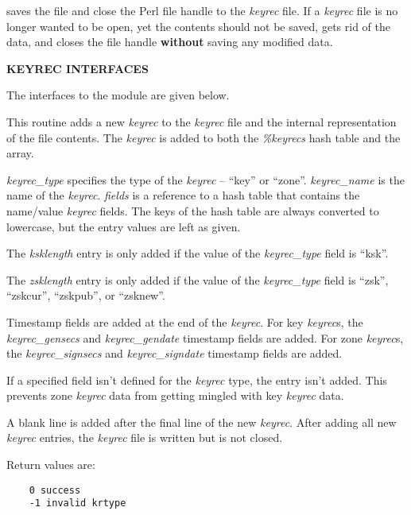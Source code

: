  saves the file and close the Perl file handle to the
{\it keyrec} file.  If a {\it keyrec} file is no longer wanted to be open, yet
the contents should not be saved,  gets rid of the
data, and closes the file handle {\bf without} saving any modified data.

{\bf KEYREC INTERFACES}

The interfaces to the  module are given
below.

\begin{description}

\item {}

This routine adds a new {\it keyrec} to the {\it keyrec} file and the internal
representation of the file contents.  The {\it keyrec} is added to both the
{\it \%keyrecs} hash table and the {\it \@keyreclines} array.

{\it keyrec\_type} specifies the type of the {\it keyrec} -- ``key'' or
``zone''.  {\it keyrec\_name} is the name of the {\it keyrec}.  {\it fields}
is a reference to a hash table that contains the name/value {\it keyrec}
fields.  The keys of the hash table are always converted to lowercase, but the
entry values are left as given.

The {\it ksklength} entry is only added if the value of the {\it keyrec\_type}
field is ``ksk''.

The {\it zsklength} entry is only added if the value of the {\it keyrec\_type}
field is ``zsk'', ``zskcur'', ``zskpub'', or ``zsknew''.

Timestamp fields are added at the end of the {\it keyrec}.  For key {\it
keyrec}s, the {\it keyrec\_gensecs} and {\it keyrec\_gendate} timestamp fields
are added.  For zone {\it keyrec}s, the {\it keyrec\_signsecs} and {\it
keyrec\_signdate} timestamp fields are added.

If a specified field isn't defined for the {\it keyrec} type, the entry isn't
added.  This prevents zone {\it keyrec} data from getting mingled with key
{\it keyrec} data.

A blank line is added after the final line of the new {\it keyrec}.  After
adding all new {\it keyrec} entries, the {\it keyrec} file is written but is
not closed.

Return values are:

\begin{verbatim}
    0 success
    -1 invalid krtype
\end{verbatim}


\end{description}
